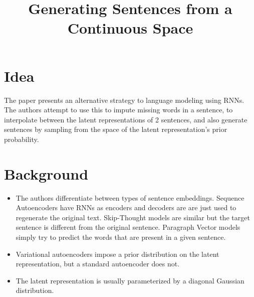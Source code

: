 \documentclass[12pt]{article}
\begin{document}
\title{Generating Sentences from a Continuous Space}
\author{}
\date{}
\maketitle

\section{Idea}
  The paper presents an alternative strategy to language modeling using RNNs. The authors attempt to use this to impute missing words in a sentence, to interpolate between the latent representations of 2 sentences, and also generate sentences by sampling from the space of the latent representation's prior probability.

\section{Background}
  \begin{itemize}
    \item The authors differentiate between types of sentence embeddings. Sequence Autoencoders have RNNs as encoders and decoders are are just used to regenerate the original text. Skip-Thought models are similar but the target sentence is different from the original sentence. Paragraph Vector models simply try to predict the words that are present in a given sentence.
    \item Variational autoencoders impose a prior distribution on the latent representation, but a standard autoencoder does not.
    \item The latent representation is usually parameterized by a diagonal Gaussian distribution.
  \end{itemize}
\end{document}
